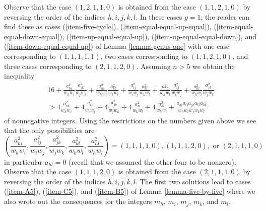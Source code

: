 Observe that the case $(1, 2, 1, 1, 0)$ is obtained from the case
$(1, 1, 2, 1, 0)$ by reversing the order of the indices $h, i, j, k, l$.
In these cases $g = 1$; the reader can find these as cases
(\ref{item-five-cycle}),
(\ref{item-equal-equal-up-equal}), (\ref{item-equal-equal-down-equal}),
(\ref{item-up-equal-equal-up}), (\ref{item-up-equal-equal-down}), and
(\ref{item-down-equal-equal-up}) of Lemma \ref{lemma-genus-one}
with one case corresponding to $(1, 1, 1, 1, 1)$,
two cases corresponding to $(1, 1, 2, 1, 0)$, and
three cases corresponding to $(2, 1, 1, 2, 0)$.
Assuming $n > 5$ we obtain the inequality
\begin{align*}
16 + 
\frac{a_{hi}^2}{w_hw_i}\frac{a_{jk}^2}{w_jw_k} +
\frac{a_{hi}^2}{w_hw_i}\frac{a_{kl}^2}{w_kw_l} +
\frac{a_{ij}^2}{w_iw_j}\frac{a_{kl}^2}{w_kw_l} +
\frac{a_{hl}^2}{w_hw_l}\frac{a_{ij}^2}{w_iw_j} +
\frac{a_{hl}^2}{w_hw_l}\frac{a_{jk}^2}{w_jw_k} \\
> 4\frac{a_{hi}^2}{w_hw_i} +
4\frac{a_{ij}^2}{w_iw_j} +
4\frac{a_{jk}^2}{w_jw_k} +
4\frac{a_{kl}^2}{w_kw_l} +
4\frac{a_{hl}^2}{w_hw_l} +
\frac{a_{hi}a_{ij}a_{jk}a_{kl}a_{hl}}{w_hw_iw_jw_kw_l}
\end{align*}
of nonnegative integers.  Using the restrictions on the numbers given above
we see that the only possibilities are
$$
(\frac{a_{hi}^2}{w_hw_i}, \frac{a_{ij}^2}{w_iw_j},
\frac{a_{jk}^2}{w_jw_k}, \frac{a_{kl}^2}{w_kw_l}, \frac{a_{hl}^2}{w_hw_l}) =
(1, 1, 1, 1, 0), (1, 1, 1, 2, 0), \text{ or } (2, 1, 1, 1, 0)
$$
in particular $a_{hl} = 0$ (recall that we assumed the other four
to be nonzero). Observe that the case $(1, 1, 1, 2, 0)$
is obtained from the case $(2, 1, 1, 1, 0)$ by reversing the order
of the indices $h, i, j, k, l$. The first two solutions lead to
cases (\ref{item-A5}), (\ref{item-C5}), and (\ref{item-B5}) of
Lemma \ref{lemma-five-by-five} where we also wrote out the
consequences for the integers $m_h$, $m_i$, $m_j$, $m_k$, and $m_l$.

